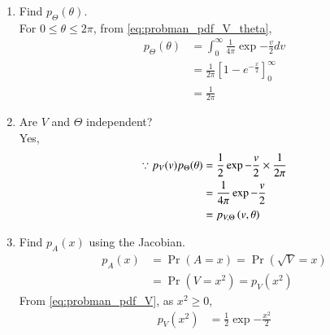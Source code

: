 \begin{enumerate}[label=\thesubsection.\arabic*.,ref=\thesubsection.\theenumi]
\item
Find $p_{\Theta}(\theta)$.  
\\
\solution For $0 \le \theta \le 2\pi$, from \eqref{eq:probman_pdf_V_theta},
\begin{align}
p_{\Theta}(\theta) &= \int_{0}^{\infty} \frac{1}{4\pi}\exp{-\frac{v}{2}} d v \\
&= \frac{1}{2\pi} \left[1 - e^{-\frac{x}{2}} \right]_{0}^{\infty}\\
&= \frac{1}{2\pi}
\end{align}
%
\item
Are $V$ and $\Theta$ independent?
\\
\solution Yes,
\begin{align}
\because p_{V}(v)p_{\Theta}(\theta) &= \frac{1}{2}\exp{-\frac{v}{2}} \times \frac{1}{2\pi}\\
&= \frac{1}{4\pi}\exp{-\frac{v}{2}}\\
&= p_{V,\Theta}\left(v,\theta\right)
\end{align}
\item
Find $p_{A}(x)$ using the Jacobian.
\\
\solution 
\begin{align}
p_{A}(x) &= \Pr(A=x) = \Pr(\sqrt{V} = x) \\
&= \Pr(V=x^2) = p_V(x^2)
\end{align}
From \eqref{eq:probman_pdf_V}, as $x^2 \ge 0$,
\begin{align}
p_{V}(x^2) &= \frac{1}{2}\exp{-\frac{x^2}{2}} 
\end{align}
%
%

%
%
%
\end{enumerate}
